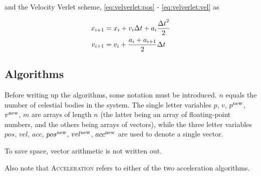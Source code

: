 \documentclass[a4paper]{article}
\begin{document}
and the Velocity Verlet scheme, \ref{eq:velverlet:pos} - \ref{eq:velverlet:vel} as

\begin{align}
    x_{i+1} &= x_{i} + v_{i}{\Delta t} + a_{i} \frac{{\Delta t}^2}{2} \\
    v_{i+1} &= v_{i} + \frac{a_{i} + a_{i+1}}{2}{\Delta t}
\end{align}





\subsection{Algorithms}
\label{subsec:alg}

Before writing up the algorithms, some notation must be introduced.
$n$ equals the number of celestial bodies in the system.
The single letter variables $p$, $v$, $p^{\mathrm{new}}$, $v^{\mathrm{new}}$, $m$ are arrays of length $n$ (the latter being an array of floating-point numbers, and the others being arrays of vectors), while the three letter variables $pos$, $vel$, $acc$, $pos^{\mathrm{new}}$, $vel^{\mathrm{new}}$, $acc^{\mathrm{new}}$ are used to denote a single vector.

To save space, vector arithmetic is not written out.

Also note that \textsc{Acceleration} refers to either of the two acceleration algorithms.
\end{document}
